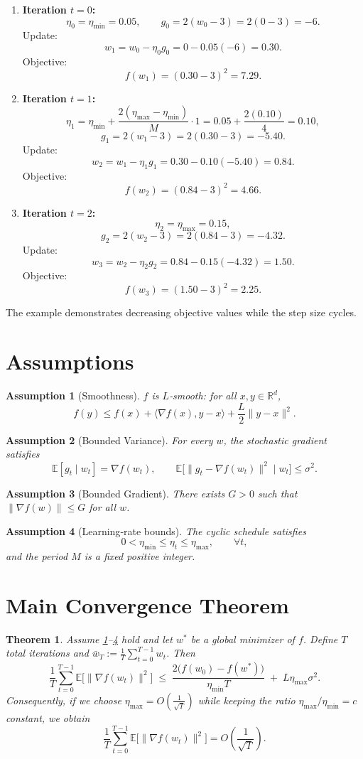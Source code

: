 \documentclass[11pt]{article}
\newtheorem{theorem}{Theorem}
\newtheorem{assumption}{Assumption}
\begin{document}
\begin{enumerate}
\item \textbf{Iteration $t=0$:} 
\[
\eta_0=\eta_{\min}=0.05,\qquad
g_0=2(w_0-3)=2(0-3)=-6.
\]
Update:
\[
w_1=w_0-\eta_0 g_0=0-0.05(-6)=0.30.
\]
Objective:
\[
f(w_1)=(0.30-3)^2=7.29.
\]

\item \textbf{Iteration $t=1$:} 
\[
\eta_1=\eta_{\min}+ \frac{2(\eta_{\max}-\eta_{\min})}{M}\cdot1
       =0.05+ \frac{2(0.10)}{4}=0.10,
\]
\[
g_1=2(w_1-3)=2(0.30-3)=-5.40.
\]
Update:
\[
w_2=w_1-\eta_1 g_1=0.30-0.10(-5.40)=0.84.
\]
Objective:
\[
f(w_2)=(0.84-3)^2=4.66.
\]

\item \textbf{Iteration $t=2$:} 
\[
\eta_2=\eta_{\max}=0.15,
\]
\[
g_2=2(w_2-3)=2(0.84-3)=-4.32.
\]
Update:
\[
w_3=w_2-\eta_2 g_2=0.84-0.15(-4.32)=1.50.
\]
Objective:
\[
f(w_3)=(1.50-3)^2=2.25.
\]
\end{enumerate}
The example demonstrates decreasing objective values while the step size cycles.

\newpage
\section*{Assumptions}
\begin{assumption}[Smoothness]\label{as:smooth}
$f$ is $L$‑smooth: for all $x,y\in\mathbb{R}^d$,
\[
f(y)\le f(x)+\langle\nabla f(x),y-x\rangle+\frac{L}{2}\|y-x\|^2 .
\]
\end{assumption}
\begin{assumption}[Bounded Variance]\label{as:var}
For every $w$, the stochastic gradient satisfies
\[
\mathbb{E}[g_t\mid w_t]=\nabla f(w_t),\qquad
\mathbb{E}\big[\|g_t-\nabla f(w_t)\|^2\mid w_t\big]\le\sigma^2 .
\]
\end{assumption}
\begin{assumption}[Bounded Gradient]\label{as:grad}
There exists $G>0$ such that $\|\nabla f(w)\|\le G$ for all $w$.
\end{assumption}
\begin{assumption}[Learning‑rate bounds]\label{as:lr}
The cyclic schedule satisfies
\[
0<\eta_{\min}\le\eta_t\le\eta_{\max},\qquad\forall t,
\]
and the period $M$ is a fixed positive integer.
\end{assumption}

\section*{Main Convergence Theorem}
\begin{theorem}\label{thm:main}
Assume \ref{as:smooth}–\ref{as:lr} hold and let $w^*$ be a global minimizer of $f$.
Define $T$ total iterations and $\bar w_T:=\frac1T\sum_{t=0}^{T-1}w_t$.
Then
\[
\frac1T\sum_{t=0}^{T-1}\mathbb{E}\big[\|\nabla f(w_t)\|^2\big]
\;\le\;
\frac{2\big(f(w_0)-f(w^*)\big)}{\eta_{\min}T}
\;+\;
L\eta_{\max}\sigma^2 .
\tag{3}
\]
Consequently, if we choose $\eta_{\max}=O\!\left(\frac{1}{\sqrt{T}}\right)$ while keeping the ratio
$\eta_{\max}/\eta_{\min}=c$ constant, we obtain
\[
\frac1T\sum_{t=0}^{T-1}\mathbb{E}\big[\|\nabla f(w_t)\|^2\big]=O\!\left(\frac{1}{\sqrt{T}}\right).
\]
\end{theorem}
\end{document}
